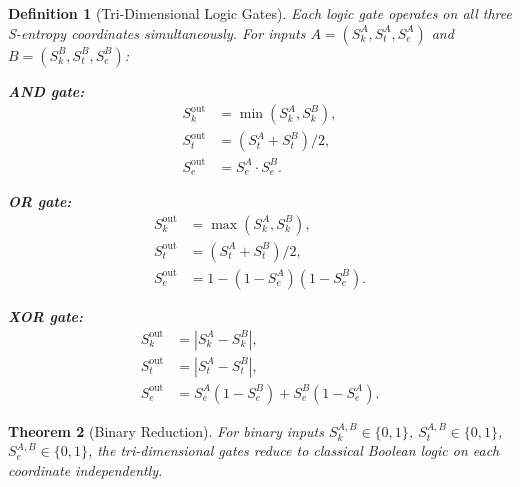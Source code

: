 \documentclass[twocolumn,10pt]{article}
\newtheorem{theorem}{Theorem}[section]
\newtheorem{definition}[theorem]{Definition}
\theoremstyle{remark}
\newcommand{\Sk}{S_k}
\newcommand{\St}{S_t}
\newcommand{\Se}{S_e}
\begin{document}
\begin{definition}[Tri-Dimensional Logic Gates]
\label{def:tri_gates}
Each logic gate operates on all three S-entropy coordinates simultaneously. For inputs $A = (\Sk^A, \St^A, \Se^A)$ and $B = (\Sk^B, \St^B, \Se^B)$:

\textbf{AND gate:}
\begin{equation}
\begin{aligned}
\Sk^{\mathrm{out}} &= \min(\Sk^A, \Sk^B), \\
\St^{\mathrm{out}} &= (\St^A + \St^B)/2, \\
\Se^{\mathrm{out}} &= \Se^A \cdot \Se^B.
\end{aligned}
\label{eq:and_gate}
\end{equation}

\textbf{OR gate:}
\begin{equation}
\begin{aligned}
\Sk^{\mathrm{out}} &= \max(\Sk^A, \Sk^B), \\
\St^{\mathrm{out}} &= (\St^A + \St^B)/2, \\
\Se^{\mathrm{out}} &= 1 - (1 - \Se^A)(1 - \Se^B).
\end{aligned}
\label{eq:or_gate}
\end{equation}

\textbf{XOR gate:}
\begin{equation}
\begin{aligned}
\Sk^{\mathrm{out}} &= |\Sk^A - \Sk^B|, \\
\St^{\mathrm{out}} &= |\St^A - \St^B|, \\
\Se^{\mathrm{out}} &= \Se^A(1 - \Se^B) + \Se^B(1 - \Se^A).
\end{aligned}
\label{eq:xor_gate}
\end{equation}
\end{definition}

\begin{theorem}[Binary Reduction]
\label{thm:binary_reduction}
For binary inputs $\Sk^{A,B} \in \{0, 1\}$, $\St^{A,B} \in \{0,1\}$, $\Se^{A,B} \in \{0,1\}$, the tri-dimensional gates reduce to classical Boolean logic on each coordinate independently.
\end{theorem}
\end{document}
